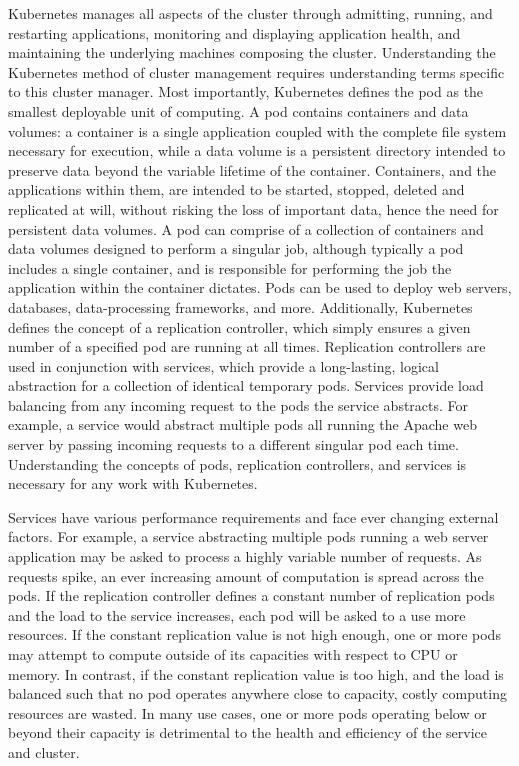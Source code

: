 \documentclass[letterpaper,11pt,twocolumn]{article}
\begin{document}
Kubernetes manages all aspects of the cluster through admitting, running, and
restarting applications, monitoring and displaying application health, and maintaining the
underlying machines composing the cluster. Understanding the Kubernetes method
of cluster management requires understanding terms specific to this cluster
manager. Most importantly, Kubernetes defines the pod as the smallest deployable unit of
computing. A pod contains containers and data
volumes: a container is a single application coupled with the complete file system
necessary for execution, while a data volume is a persistent directory intended
to preserve data beyond the variable lifetime of the
container.\cite{docker-website} Containers, and the applications within them,
are intended to be started, stopped, deleted and replicated at will, without risking
the loss of important data, hence the need for persistent data volumes.
A pod can comprise of a collection of containers and
data volumes designed to perform a singular job, although typically a pod
includes a single container, and is responsible for performing the job the
application within the container dictates. Pods can be used to deploy web
servers, databases, data-processing frameworks, and more.\cite{k8s-pods} Additionally,
Kubernetes defines the concept of a replication controller, which simply ensures
a given number of a specified pod are running at all
times.\cite{k8s-replication-controllers} Replication
controllers are used in conjunction with services, which provide a long-lasting,
logical abstraction for a collection of identical temporary pods.
Services provide load balancing from any incoming request to the pods the
service abstracts.\cite{k8s-services} For example, a service would abstract
multiple pods all running the Apache web server by passing incoming requests to
a different singular pod each time. Understanding the concepts of pods,
replication controllers, and services is necessary for any work with Kubernetes.

Services have various performance requirements and face ever
changing external factors. For example, a service abstracting multiple pods
running a web server application
may be asked to process a highly variable number of requests. As requests spike,
an ever increasing amount of computation is spread across the pods. If the
replication controller defines a constant number of replication pods and the
load to the service increases, each pod will be asked to a use more resources.
If the constant replication value is not high enough, one or more pods may attempt to
compute outside of its capacities with respect to CPU or memory.
In contrast, if the constant replication value is too high,
and the load is balanced such that no pod operates anywhere
close to capacity, costly computing resources are wasted.
In many use cases, one or more pods operating below or beyond their capacity
is detrimental to the health and efficiency of the service and cluster.
\end{document}
